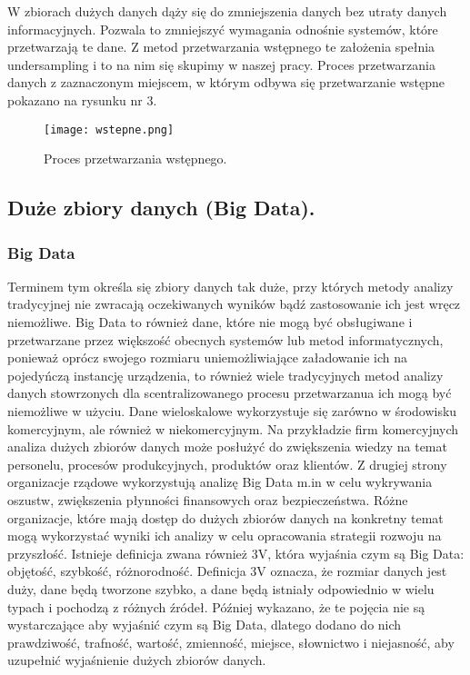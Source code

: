 \documentclass{article}
\begin{document}
W zbiorach dużych danych dąży się do zmniejszenia danych bez utraty danych informacyjnych. Pozwala to zmniejszyć wymagania odnośnie systemów, które przetwarzają te dane. Z metod przetwarzania wstępnego te założenia spełnia undersampling i to na nim się skupimy w naszej pracy. Proces przetwarzania danych z zaznaczonym miejscem, w którym odbywa się przetwarzanie wstępne pokazano na rysunku nr 3.\newline
\break
\begin{figure}[h!]
\texttt{[image: wstepne.png]}
\caption{Proces przetwarzania wstępnego.} 
\label{fig:under_oversampling}
\end{figure}
\break
\break
\break


\subsection{Duże zbiory danych (Big Data).}
\subsubsection{Big Data}
\hfill \break

Terminem tym określa się zbiory danych tak duże, przy których metody analizy tradycyjnej nie zwracają oczekiwanych wyników bądź zastosowanie ich jest wręcz niemożliwe. Big Data to również dane, które nie mogą być obsługiwane i przetwarzane przez większość obecnych systemów lub metod informatycznych, ponieważ oprócz swojego rozmiaru uniemożliwiające załadowanie ich na pojedyńczą instancję urządzenia, to również wiele tradycyjnych metod analizy danych stowrzonych dla scentralizowanego procesu przetwarzanua ich mogą być niemożliwe w użyciu. Dane wieloskalowe wykorzystuje się zarówno w środowisku komercyjnym, ale również w niekomercyjnym. Na przykładzie firm komercyjnych analiza dużych zbiorów danych może posłużyć do zwiększenia wiedzy na temat personelu, procesów produkcyjnych, produktów oraz klientów. Z drugiej strony organizacje rządowe wykorzystują analizę Big Data m.in w celu wykrywania oszustw, zwiększenia płynności finansowych oraz bezpieczeństwa. Różne organizacje, które mają dostęp do dużych zbiorów danych na konkretny temat mogą wykorzystać wyniki ich analizy w celu opracowania strategii rozwoju na przyszłość. Istnieje definicja zwana również 3V, która wyjaśnia czym są Big Data: objętość, szybkość, różnorodność. Definicja 3V oznacza, że rozmiar danych jest duży, dane będą tworzone szybko, a dane będą istniały odpowiednio w wielu typach i pochodzą z różnych źródeł. Później wykazano, że te pojęcia nie są wystarczające aby wyjaśnić czym są Big Data, dlatego dodano do nich prawdziwość, trafność, wartość, zmienność, miejsce, słownictwo i niejasność, aby uzupełnić wyjaśnienie dużych zbiorów danych. %
\end{document}
